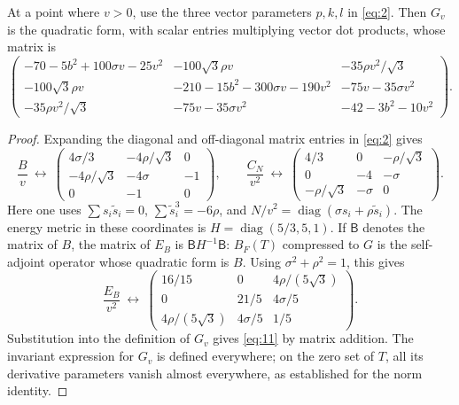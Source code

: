 \begin{lemma}
\label{lem:hessian-matrices}
At a point where \(v>0\), use the three vector parameters \(p,k,l\) in
\eqref{eq:2}.  Then \(G_v\) is the quadratic form, with scalar entries
multiplying vector dot products, whose matrix is
\begin{equation}
 \begin{pmatrix}
 -70-5b^2+100\sigma v-25v^2
   &-100\sqrt3\rho v&-35\rho v^2/\sqrt3\\
 -100\sqrt3\rho v
   &-210-15b^2-300\sigma v-190v^2&-75v-35\sigma v^2\\
 -35\rho v^2/\sqrt3
   &-75v-35\sigma v^2&-42-3b^2-10v^2
 \end{pmatrix}.
 \tag{11}\label{eq:11}
\end{equation}
\end{lemma}

\begin{proof}
Expanding the diagonal and off-diagonal matrix entries in \eqref{eq:2}
gives
\[
 \frac{B}{v}\ \longleftrightarrow\
 \begin{pmatrix}
 4\sigma/3&-4\rho/\sqrt3&0\\
 -4\rho/\sqrt3&-4\sigma&-1\\
 0&-1&0
 \end{pmatrix},
 \qquad
 \frac{C_N}{v^2}\ \longleftrightarrow\
 \begin{pmatrix}
 4/3&0&-\rho/\sqrt3\\
 0&-4&-\sigma\\
 -\rho/\sqrt3&-\sigma&0
 \end{pmatrix}.
\]
Here one uses
\(\sum s_i\widetilde s_i=0\),
\(\sum\widetilde s_i^3=-6\rho\), and
\(N/v^2=\operatorname{diag}(\sigma s_i+\rho\widetilde s_i)\).
The energy metric in these coordinates is
\(H=\operatorname{diag}(5/3,5,1)\).
If \(\mathsf B\) denotes the matrix of \(B\), the matrix of \(E_B\) is
\(\mathsf B H^{-1}\mathsf B\): \(B_F(T)\) compressed to
\(G\) is the self-adjoint operator whose quadratic form is
\(B\).  Using \(\sigma^2+\rho^2=1\), this gives
\[
 \frac{E_B}{v^2}\ \longleftrightarrow\
 \begin{pmatrix}
 16/15&0&4\rho/(5\sqrt3)\\
 0&21/5&4\sigma/5\\
 4\rho/(5\sqrt3)&4\sigma/5&1/5
 \end{pmatrix}.
\]
Substitution into the definition of \(G_v\) gives \eqref{eq:11} by
matrix addition.  The invariant expression for \(G_v\) is defined
everywhere; on the zero set of \(T\), all its derivative parameters
vanish almost everywhere, as established for the norm identity.
\end{proof}

